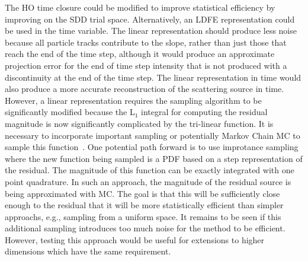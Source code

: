 The HO time closure could be modified to improve statistical efficiency by improving on
the SDD trial space. Alternatively, an LDFE representation could be used in the time
variable. The linear representation should produce less noise because all particle tracks
contribute to the slope, rather than just those that reach the end of the time step,
although it would produce an approximate projection error for the end of time step
intensity that is not produced with a discontinuity at the end of the time step.  The
linear representation in time would also produce a more accurate reconstruction of the
scattering source in time.  However, a linear representation requires the sampling
algorithm to be significantly modified because the L$_1$ integral for computing the
residual magnitude is now significantly complicated by the tri-linear function.  It is
necessary to incorporate important sampling or potentially Markov Chain MC to sample this
function~\cite{shultis_mc}.  One potential path forward is to use improtance sampling
where the new function being sampled is a PDF based on a step representation of the
residual.  The magnitude of this function can be exactly integrated with one point
quadrature.  In such an approach, the magnitude of the residual source is being
approximated with MC.  The goal is that this will be sufficiently close enough to the
residual that it will be more statistically efficient than simpler approachs, e.g.,
sampling from a uniform space.
It remains to be seen if this additional sampling introduces too
much noise for the method to be efficient.  However, testing this approach would be useful
for extensions to higher dimensions which have the same requirement.



